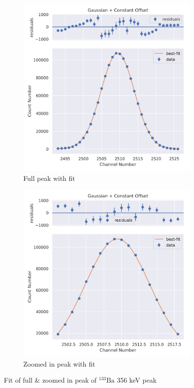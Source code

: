 \documentclass[11pt,a4paper]{article}
\newcommand{\element}[2]{$^{#2}\textrm{#1}$}
\begin{document}
\begin{figure}[H]
  \centering
  \begin{subfigure}{.5\linewidth}
    \centering
    \includegraphics[width=\linewidth]{./Images/Barium133/Gauss/Gauss_6_Full.png}
    \caption{Full peak with fit}
  \end{subfigure}%
  \begin{subfigure}{.5\linewidth}
    \centering
    \includegraphics[width=\linewidth]{./Images/Barium133/Gauss/Gauss_6_Zoom.png}
    \caption{Zoomed in peak with fit}
  \end{subfigure}
  \caption{Fit of full \& zoomed in peak of \element{Ba}{133} 356 keV peak}
\end{figure}
\end{document}
